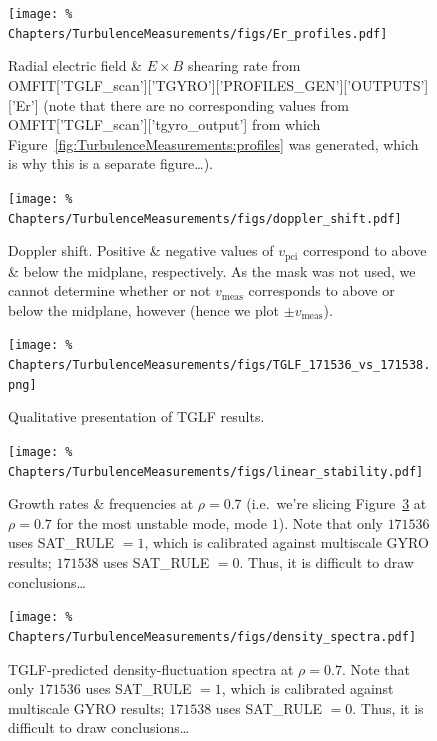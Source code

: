 \begin{figure}[h!]
  \centering
  \texttt{[image: \%
    Chapters/TurbulenceMeasurements/figs/Er\_profiles.pdf]}
  \caption[Radial electric field \& $E \times B$ shearing rate]{%
    Radial electric field \& $E \times B$ shearing rate from
    OMFIT['TGLF\_scan']['TGYRO']['PROFILES\_GEN']['OUTPUTS']['Er']
    (note that there are no corresponding values from
    OMFIT['TGLF\_scan']['tgyro\_output']
    from which Figure~\ref{fig:TurbulenceMeasurements:profiles}
    was generated, which is why this is a separate figure\ldots).
  }
\label{fig:TurbulenceMeasurements:Er_profiles}
\end{figure}

\begin{figure}[h!]
  \centering
  \texttt{[image: \%
    Chapters/TurbulenceMeasurements/figs/doppler\_shift.pdf]}
  \caption[Doppler shift]{%
    Doppler shift. Positive \& negative values of $v_{\text{pci}}$
    correspond to above \& below the midplane, respectively.
    As the mask was not used, we cannot determine whether or not
    $v_{\text{meas}}$ corresponds to above or below the midplane, however
    (hence we plot $\pm v_{\text{meas}}$).
  }
\label{fig:TurbulenceMeasurements:doppler_shift}
\end{figure}

\begin{figure}[h!]
  \centering
  \texttt{[image: \%
    Chapters/TurbulenceMeasurements/figs/TGLF\_171536\_vs\_171538.png]}
  \caption[Qualitative presentation of TGLF results]{%
    Qualitative presentation of TGLF results.
  }
\label{fig:TurbulenceMeasurements:TGLF_171536_vs_171538}
\end{figure}

\begin{figure}[h!]
  \centering
  \texttt{[image: \%
    Chapters/TurbulenceMeasurements/figs/linear\_stability.pdf]}
  \caption[Growth rates \& frequencies at $\rho=0.7$]{%
    Growth rates \& frequencies at $\rho=0.7$
    (i.e.\ we're slicing
    Figure~\ref{fig:TurbulenceMeasurements:TGLF_171536_vs_171538}
    at $\rho = 0.7$ for the most unstable mode, mode $1$).
    Note that only $171536$ uses SAT\_RULE $= 1$,
    which is calibrated against multiscale GYRO results;
    $171538$ uses SAT\_RULE $= 0$.
    Thus, it is difficult to draw conclusions\ldots
  }
\label{fig:TurbulenceMeasurements:linear_stability}
\end{figure}

\begin{figure}[h!]
  \centering
  \texttt{[image: \%
    Chapters/TurbulenceMeasurements/figs/density\_spectra.pdf]}
  \caption[TGLF-predicted density-fluctuation spectra at $\rho=0.7$]{%
    TGLF-predicted density-fluctuation spectra at $\rho=0.7$.
    Note that only $171536$ uses SAT\_RULE $= 1$,
    which is calibrated against multiscale GYRO results;
    $171538$ uses SAT\_RULE $= 0$.
    Thus, it is difficult to draw conclusions\ldots
  }
\label{fig:TurbulenceMeasurements:density_spectra}
\end{figure}
